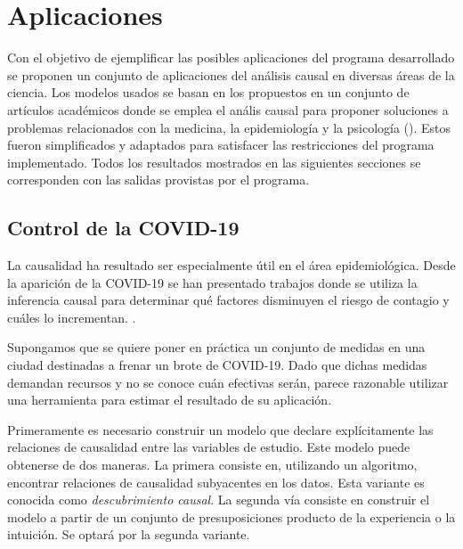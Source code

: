 \chapter{Aplicaciones}
Con el objetivo de ejemplificar las posibles aplicaciones del programa desarrollado se proponen un conjunto de aplicaciones del análisis causal en diversas áreas de la ciencia. Los modelos usados se basan en los propuestos en un conjunto de artículos académicos donde se emplea el anális causal para proponer soluciones a problemas relacionados con la medicina, la epidemiología y la psicología (\cite{matsuura2009structural, oh2001development, steiger2021causal}). Estos fueron simplificados y adaptados para satisfacer las restricciones del programa implementado. Todos los resultados mostrados en las siguientes secciones se corresponden con las salidas provistas por el programa.

\section{Control de la COVID-19}

La causalidad ha resultado ser especialmente útil en el área epidemiológica. Desde la aparición de la COVID-19 se han presentado trabajos donde se utiliza la inferencia causal para determinar qué factores disminuyen el riesgo de contagio y cuáles lo incrementan. \cite{bonvini2021causal, steiger2021causal}.

Supongamos que se quiere poner en práctica un conjunto de medidas en una ciudad destinadas a frenar un brote de COVID-19. Dado que dichas medidas demandan recursos y no se conoce cuán efectivas serán, parece razonable utilizar una herramienta para estimar el resultado de su aplicación.

Primeramente es necesario construir un modelo que declare explícitamente las relaciones de causalidad entre las variables de estudio. Este modelo puede obtenerse de dos maneras. La primera consiste en, utilizando un algoritmo, encontrar relaciones de causalidad subyacentes en los datos. Esta variante es conocida como \textit{descubrimiento causal}. La segunda vía consiste en construir el modelo a partir de un conjunto de presuposiciones producto de la experiencia o la intuición. Se optará por la segunda variante.

